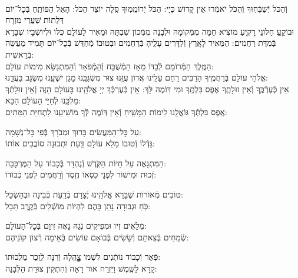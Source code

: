 \documentclass[twoside, openany, parskip=half, 11pt]{book}
\begin{document}
\\
\shatz {}
וְֿהַכֹּל יְֿשַׁבְּֿחֽוּךָ וְֿהַכֹּל יֹאמְֿרוּ אֵין קָדוֹשׁ כַּיָי:\hfill \break
\kahal הַכֹּל יְֿרוֹמֲמֽוּךָ סֶּֽלָה יוֹצֵר הַכֹּל: הָאֵל הַפּוֹתֵֽחַ בְּֿכׇל־יוֹם דַּלְתוֹת שַׁעֲרֵי מִזְרָח\\
\shatz וּבוֹקֵֽעַ חַלּוֹנֵי רָקִֽיעַ מוֹצִיא חַמָּה מִמְּֿקוֹמָהּ וּלְבָנָה מִמְּֿכוֹן שִׁבְתָּהּ
\kahal וּמֵאִיר לָעוֹלָם כֻּלּוֹ וּלְיוֹשְֿׁבָיו שֶׁבָּרָא בְּֿמִדַּת רַחֲמִים: \hfill \break
\shatz הַמֵּאִיר לָאָֽרֶץ וְֿלַדָּרִים עָלֶֽיהָ בְּֿרַחֲמִים וּבְטוּבוֹ מְֿחַדֵּשׁ בְּֿכׇל־יוֹם תָּמִיד מַעֲשֵׂה בְֿרֵאשִׁית: \\
\kahal הַמֶּֽלֶךְ הַמְּֿרוֹמָם לְֿבַדּוֹ מֵאָז הַמְֿשֻׁבָּח וְֿהַמְֿפֹאָר וְֿהַמִּתְנַשֵּׂא מִימוֹת עוֹלָם: \\
\shatz אֱלֹהֵי עוֹלָם בְּֿרַחֲמֶֽיךָ הָרַבִּים רַחֵם עָלֵֽינוּ אֲדוֹן עֻזֵּֽנוּ צוּר מִשְׂגַּבֵּֽנוּ מָגֵן יִשְׁעֵֽנוּ מִשְׂגָּב בַּעֲדֵֽנוּ: \\
\kahal אֵין כְּֿעֶרְֿכֶּֽךָ וְֿאֵין זוּלָתֶֽךָ אֶפֶס בִּלְתֶּֽךָ וּמִי דּֽוֹמֶה לָּךְ: \hfill \break
\shatz אֵין כְּֿעֶרְכְּֿךָ יְיָ אֱלֹהֵֽינוּ בָּעוֹלָם הַזֶּה וְֿאֵין זוּלָתְֿךָ מַלְכֵּֽנוּ לְֿחַיֵּי הָעוֹלָם הַבָּא:\\
\kahal אֶֽפֶס בִּלְתְּֿךָ גּוֹאֲלֵֽנוּ לִימוֹת הַמָּשִֽׁיחַ וְֿאֵין דּֽוֹמֶה לְּֿךָ מוֹשִׁיעֵֽנוּ לִתְחִיַּת הַמֵּתִים:

\shatz {}
עַל כׇּל־הַמַּעֲשִׂים \hfill בָּרוּךְ וּמְבֹרָךְ בְּֿפִי כׇּל־נְשָׁמָה: \\
\kahal גָּדְֿלוֹ וְֿטוּבוֹ מָלֵא עוֹלָם \hfill דַּֽעַת וּתְבוּנָה סוֹבֲבִים אוֹתוֹ:

\shatz הַמִּתְגָּאֶה עַל חַיּוֹת הַקֹּֽדֶשׁ \hfill וְֿנֶהְדָּר בְּֿכָבוֹד עַל הַמֶּרְכָּבָה:\\
\kahal זְֿכוּת וּמִישׁוֹר לִפְנֵי כִסְאוֹ \hfill חֶֽסֶד וְֿרַחֲמִים לִפְנֵי כְֿבוֹדוֹ:

\shatz טוֹבִים מְֿאוֹרוֹת שֶׁבָּרָא אֱלֹהֵֽינוּ \hfill יְֿצָרָם בְּֿדַֽעַת בְּֿבִינָה וּבְהַשְׂכֵּל:\\
\kahal כֹּֽחַ וּגְבוּרָה נָתַן בָּהֶם \hfill לִהְיוֹת מוֹשְֿׁלִים בְּֿקֶֽרֶב תֵּבֵל:

\shatz מְֿלֵאִים זִיו וּמְפִיקִים נֹֽגַהּ \hfill נָאֶה זִיוָם בְּֿכׇל־הָעוֹלָם: \\
\kahal שְֿׂמֵחִים בְּֿצֵאתָם וְֿשָׂשִׂים בְּֿבוֹאָם \hfill עוֹשִׂים בְּֿאֵימָה רְֿצוֹן קוׂנֵיהֶם:

\shatz פְּֿאֵר וְֿכָבוֹד נוֹתְֿנִים לִשְׁמוֹ \hfill צׇׇׇׇָהֳלָה וְֿרִנָּה לְֿזֵֽכֶר מַלְכוּתוֹ: \\
\kahal קָרָא לַשֶּֽׁמֶשׁ וַיִּזְרַח אוֹר \hfill רָאָה וְֿהִתְקִין צוּרַת הַלְּֿבָנָה:
\end{document}
